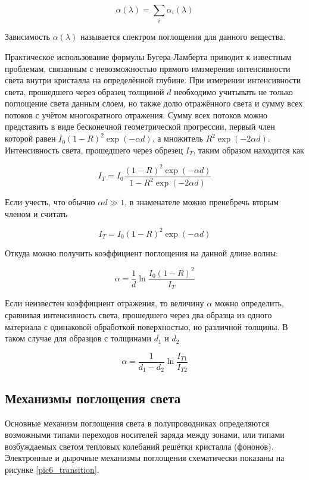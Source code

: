 \begin{equation}
\alpha(\lambda) = \sum\limits_{i}{\alpha_{i}(\lambda)}
\label{eq6_alphasum}
\end{equation}

Зависимость $\alpha(\lambda)$ называется спектром поглощения для данного вещества.

Практическое использование формулы Бугера-Ламберта приводит к известным проблемам, связанным с невозможностью прямого имзмерения интенсивности света внутри кристалла на определённой глубине. При измерении интенсивности света, прошедшего через образец толщиной $d$ необходимо учитывать не только поглощение света данным слоем, но также долю отражённого света и сумму всех потоков с учётом многократного отражения. Сумму всех потоков можно представить в виде бесконечной геометрической прогрессии, первый член которой равен $I_{0} (1-R)^2 \exp(-\alpha d)$, а множитель $R^2 \exp(-2 \alpha d)$. Интенсивность света, прошедшего через обрезец $I_{T}$, таким образом находится как

\begin{equation}
I_{T} = I_{0} \frac{(1-R)^2 \exp(-\alpha d)}{1 - R^2 \exp(-2 \alpha d)}
\end{equation}

Если учесть, что обычно $\alpha d \gg 1$, в знаменателе можно пренебречь вторым членом и считать

\begin{equation}
I_{T} = I_{0} (1-R)^2 \exp(-\alpha d)
\end{equation}

Откуда можно получить коэффициент поглощения на данной длине волны:

\begin{equation}
\alpha = \frac{1}{d} \ln \frac{I_{0} (1-R)^2}{I_{T}}
\label{eq6_alpha_T}
\end{equation}

Если неизвестен коэффициент отражения, то величину $\alpha$ можно определить, сравнивая интенсивность света, прошедшего через два образца из одного материала с одинаковой обработкой поверхностью, но различной толщины. В таком случае для образцов с толщинами $d_{1}$ и $d_{2}$

\begin{equation}
\alpha = \frac{1}{d_{1}-d_{2}} \ln \frac{I_{T1}}{I_{T2}}
\end{equation}

\subsection{Механизмы поглощения света}
Основные механизм поглощения света в полупроводниках определяются возможными типами переходов носителей заряда между зонами, или типами возбуждаемых светом тепловых колебаний решётки кристалла (фононов). Электронные и дырочные механизмы поглощения схематически показаны на рисунке \ref{pic6_transition}.

